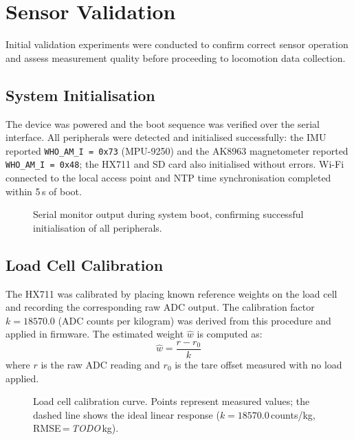 \section{Sensor Validation}
\label{section:sensor_validation}

Initial validation experiments were conducted to confirm correct sensor
operation and assess measurement quality before proceeding to locomotion
data collection.

\subsection{System Initialisation}

The device was powered and the boot sequence was verified over the serial
interface.
All peripherals were detected and initialised successfully:
the IMU reported \texttt{WHO\_AM\_I\,=\,0x73} (MPU-9250) and the AK8963
magnetometer reported \texttt{WHO\_AM\_I\,=\,0x48};
the HX711 and SD card also initialised without errors.
Wi-Fi connected to the local access point and NTP time synchronisation
completed within 5\,s of boot.

\begin{figure}[h]
  \centering
  \caption{Serial monitor output during system boot, confirming successful
           initialisation of all peripherals.}
  \label{fig:boot_serial}
\end{figure}

\subsection{Load Cell Calibration}

The HX711 was calibrated by placing known reference weights on the load cell
and recording the corresponding raw ADC output.
The calibration factor $k = 18570.0$ (ADC counts per kilogram) was derived
from this procedure and applied in firmware.
The estimated weight $\hat{w}$ is computed as:
\begin{equation}
  \hat{w} = \frac{r - r_0}{k}
  \label{eq:hx711_calib}
\end{equation}
where $r$ is the raw ADC reading and $r_0$ is the tare offset measured
with no load applied.

\begin{figure}[h]
  \centering
  \caption{Load cell calibration curve. Points represent measured values;
           the dashed line shows the ideal linear response
           ($k = 18570.0$\,counts/kg,
           RMSE\,=\,\textit{TODO}\,kg).}  %
  \label{fig:load_cell_calib}
\end{figure}

